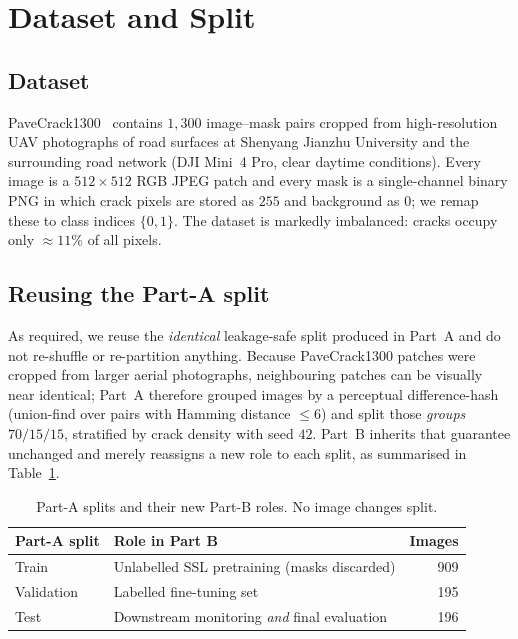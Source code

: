 \documentclass[conference]{IEEEtran}
\begin{document}
\section{Dataset and Split}

\subsection{Dataset}
PaveCrack1300~\cite{pavecrack} contains $1{,}300$ image--mask pairs cropped from high-resolution UAV
photographs of road surfaces at Shenyang Jianzhu University and the surrounding road
network (DJI Mini~4 Pro, clear daytime conditions). Every image is a
$512\times512$ RGB JPEG patch and every mask is a single-channel binary PNG in which
crack pixels are stored as $255$ and background as $0$; we remap these to class
indices $\{0,1\}$. The dataset is markedly imbalanced: cracks occupy only
$\approx 11\%$ of all pixels.

\subsection{Reusing the Part-A split}
As required, we reuse the \emph{identical} leakage-safe split produced in Part~A and
do not re-shuffle or re-partition anything. Because PaveCrack1300 patches were
cropped from larger aerial photographs, neighbouring patches can be visually near
identical; Part~A therefore grouped images by a perceptual difference-hash
(union-find over pairs with Hamming distance $\le 6$) and split those \emph{groups}
$70/15/15$, stratified by crack density with seed $42$. Part~B inherits that
guarantee unchanged and merely reassigns a new role to each split, as summarised in
Table~\ref{tab:roles}.

\begin{table}[t]
\caption{Part-A splits and their new Part-B roles. No image changes split.}
\label{tab:roles}
\centering
\begin{tabular}{@{}llr@{}}
\toprule
\textbf{Part-A split} & \textbf{Role in Part B} & \textbf{Images} \\
\midrule
Train      & Unlabelled SSL pretraining (masks discarded) & 909 \\
Validation & Labelled fine-tuning set                     & 195 \\
Test       & Downstream monitoring \emph{and} final evaluation & 196 \\
\bottomrule
\end{tabular}
\end{table}
\end{document}
